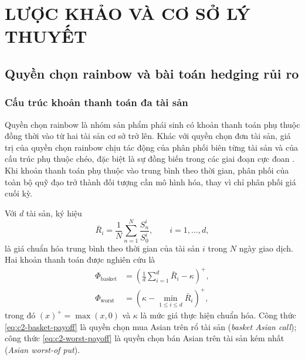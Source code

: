 
\chapter{LƯỢC KHẢO VÀ CƠ SỞ LÝ THUYẾT}
\label{chap:co-so-ly-thuyet}

\section{Quyền chọn rainbow và bài toán hedging rủi ro}
\label{sec:c2-rainbow}

\subsection{Cấu trúc khoản thanh toán đa tài sản}

Quyền chọn rainbow là nhóm sản phẩm phái sinh có khoản thanh toán phụ thuộc
đồng thời vào từ hai tài sản cơ sở trở lên. Khác với quyền chọn đơn tài sản,
giá trị của quyền chọn rainbow chịu tác động của phân phối biên từng tài sản
và của cấu trúc phụ thuộc chéo, đặc biệt là sự đồng biến trong các giai đoạn
cực đoan \parencite{Johnson1987,Wystup2006}. Khi khoản thanh toán phụ
thuộc vào trung bình theo thời gian, phân phối của toàn bộ quỹ đạo trở thành
đối tượng cần mô hình hóa, thay vì chỉ phân phối giá cuối kỳ.

Với $d$ tài sản, ký hiệu
\begin{equation}
    \bar R_i=\frac{1}{N}\sum_{n=1}^{N}\frac{S_n^i}{S_0^i},
    \qquad i=1,\ldots,d,
    \label{eq:c2-path-average}
\end{equation}
là giá chuẩn hóa trung bình theo thời gian của tài sản $i$ trong $N$ ngày giao
dịch. Hai khoản thanh toán được nghiên cứu là
\begin{align}
    \Phi_{\mathrm{basket}}
    &=\left(\frac{1}{d}\sum_{i=1}^{d}\bar R_i-\kappa\right)^{+},
    \label{eq:c2-basket-payoff}\\
    \Phi_{\mathrm{worst}}
    &=\left(\kappa-\min_{1\le i\le d}\bar R_i\right)^{+},
    \label{eq:c2-worst-payoff}
\end{align}
trong đó $(x)^{+}=\max(x,0)$ và $\kappa$ là mức giá thực hiện chuẩn hóa. Công thức
\eqref{eq:c2-basket-payoff} là quyền chọn mua Asian trên rổ tài sản
(\textit{basket Asian call}); công thức \eqref{eq:c2-worst-payoff} là quyền
chọn bán Asian trên tài sản kém nhất (\textit{Asian worst-of put}).

